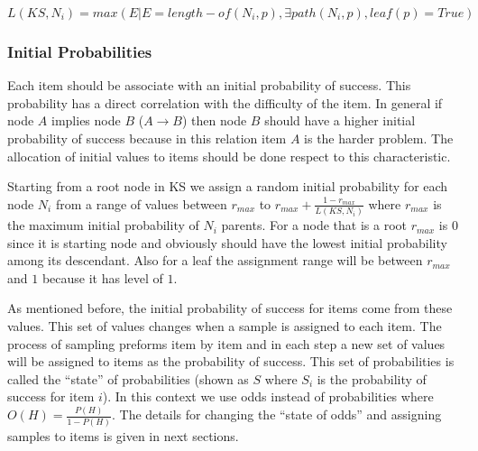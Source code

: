 \begin{equation}
L(KS,N_{i}) = max(E|E=length-of(N_{i},p)  ,  \exists path(N_{i},p)  , leaf(p)=True)
\label{EQ:Level}
\end{equation}


\subsubsection{Initial Probabilities}

Each item should be associate with an initial probability of success. This probability has a direct correlation with the difficulty of the item. In general if node $A$ implies node $B$ ($A \rightarrow B$) then node $B$ should have a higher initial probability of success because in this relation item $A$ is the harder problem. The allocation of initial values to items should be done respect to this characteristic. 

Starting from a root node in KS we assign a random initial probability  for each node $N_{i}$ from a range of values between $r_{max}$ to $r_{max}+\frac{1-r_{max}}{L(KS,N_{i})}$ where $r_{max}$ is the maximum initial probability of $N_{i}$ parents. For a node that is a root $r_{max}$ is $0$ since it is starting node and obviously should have the lowest initial probability among its descendant. Also for a leaf the assignment range will be between $r_{max}$ and $1$ because it has level of $1$. 

As mentioned before, the initial probability of success for items come from these values. This set of values changes when a sample is assigned to each item. The process of sampling preforms item by item and in each step a new set of values will be assigned to items as the probability of success. This set of probabilities is called the ``state'' of probabilities (shown as $S$ where $S_i$ is the probability of success for item $i$). In this context we use odds instead of probabilities where $O(H) = \frac{P(H)}{1-P(H)}$. The details for changing the ``state of odds'' and assigning samples to items is given in next sections.

